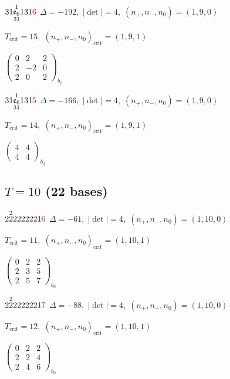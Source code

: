 \documentclass[10pt]{article}
\begin{document}
$31\overset{1}{\underset{31}{\mathfrak{e}_6}}131\textcolor{red}{6}$ \quad $\Delta=-192,\; |\det|=4,\; (n_+,n_-,n_0)=(1,9,0)$

\hspace{1em}$T_{\text{crit}}=15,\; (n_+,n_-,n_0)_{\text{crit}}=(1,9,1)$

\hspace{2em}$\left(\begin{smallmatrix}0 & 2 & 2 \\ 2 & -2 & 0 \\ 2 & 0 & 2\end{smallmatrix}\right)_{\!b_0}$

$31\overset{1}{\underset{31}{\mathfrak{e}_6}}131\textcolor{red}{5}$ \quad $\Delta=-166,\; |\det|=4,\; (n_+,n_-,n_0)=(1,9,0)$

\hspace{1em}$T_{\text{crit}}=14,\; (n_+,n_-,n_0)_{\text{crit}}=(1,9,1)$

\hspace{2em}$\left(\begin{smallmatrix}4 & 4 \\ 4 & 4\end{smallmatrix}\right)_{\!b_0}$


\subsection*{$T = 10$ \quad (22 bases)}
\smallskip

$2\overset{2}{2}2222221\textcolor{red}{6}$ \quad $\Delta=-61,\; |\det|=4,\; (n_+,n_-,n_0)=(1,10,0)$

\hspace{1em}$T_{\text{crit}}=11,\; (n_+,n_-,n_0)_{\text{crit}}=(1,10,1)$

\hspace{2em}$\left(\begin{smallmatrix}0 & 2 & 2 \\ 2 & 3 & 5 \\ 2 & 5 & 7\end{smallmatrix}\right)_{\!b_0}$

$2\overset{2}{2}2222221\textcolor{red}{7}$ \quad $\Delta=-88,\; |\det|=4,\; (n_+,n_-,n_0)=(1,10,0)$

\hspace{1em}$T_{\text{crit}}=12,\; (n_+,n_-,n_0)_{\text{crit}}=(1,10,1)$

\hspace{2em}$\left(\begin{smallmatrix}0 & 2 & 2 \\ 2 & 2 & 4 \\ 2 & 4 & 6\end{smallmatrix}\right)_{\!b_0}$
\end{document}
